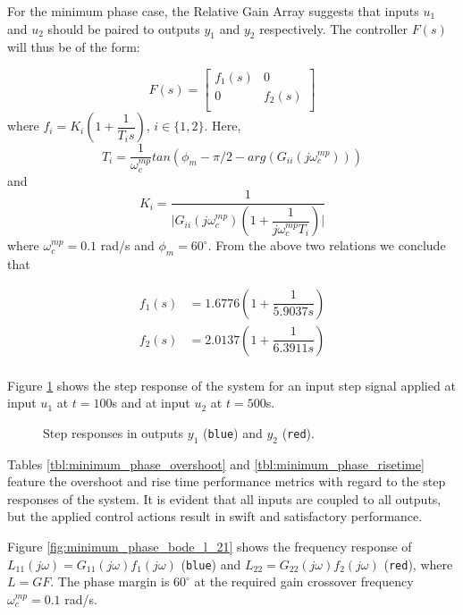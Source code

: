 For the minimum phase case, the Relative Gain Array suggests that inputs $u_1$
and $u_2$ should be paired to outputs $y_1$ and $y_2$ respectively. The
controller $F(s)$ will thus be of the form:

\[
F(s)=
\begin{bmatrix}
  f_1(s) & 0      \\
  0      & f_2(s) \\
\end{bmatrix}
\]
where $f_i = K_i (1 + \dfrac{1}{T_i s})$, $i \in \{1,2\}$. Here,
$$T_i = \dfrac{1}{\omega_c^{mp}} tan(\phi_m - \pi/2 - arg(G_{ii}(j\omega_c^{mp})))$$
and
$$K_i = \dfrac{1}{\Big|G_{ii}(j\omega_c^{mp}) (1 + \dfrac{1}{j\omega_c^{mp}T_i})\Big|}$$
where $\omega_c^{mp} = 0.1$ rad/s and $\phi_m = 60^{\circ}$. From the above two
relations we conclude that

\begin{align*}
  f_1(s) &= 1.6776 (1 + \dfrac{1}{5.9037s})  \\
  f_2(s) &= 2.0137 (1 + \dfrac{1}{6.3911s})  \\
\end{align*}

Figure \ref{fig:minimum_phase_step_23} shows the step response of the system
for an input step signal applied at input $u_1$ at $t=100$s and at input
$u_2$ at $t=500$s.

\begin{figure}[H]\centering
  \scalebox{0.8}{}
  \caption{Step responses in outputs $y_1$ (\texttt{blue}) and $y_2$
    (\texttt{red}).}
  \label{fig:minimum_phase_step_23}
\end{figure}

Tables \ref{tbl:minimum_phase_overshoot} and \ref{tbl:minimum_phase_risetime}
feature the overshoot and rise time performance metrics with regard to the
step responses of the system. It is evident that all inputs are coupled to all
outputs, but the applied control actions result in swift and satisfactory
performance.

Figure \ref{fig:minimum_phase_bode_l_21} shows the frequency response of
$L_{11}(j\omega) = G_{11}(j\omega) f_1(j\omega)$ (\texttt{blue}) and
$L_{22} = G_{22}(j\omega) f_2(j\omega)$ (\texttt{red}), where $L = GF$. The
phase margin is $60^{\circ}$ at the required gain crossover frequency
$\omega_c^{mp} = 0.1$ rad/s.

